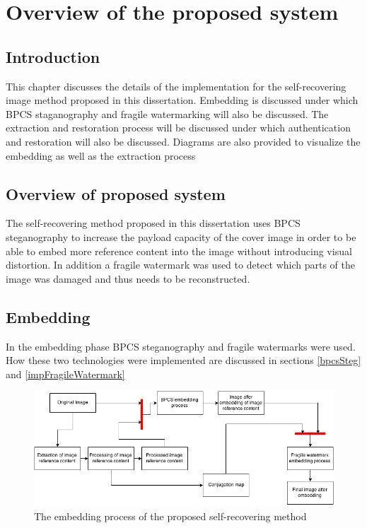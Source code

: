 \documentclass[12pt]{article}
\begin{document}
\section{Overview of the proposed system}
\label{Implementation}
\subsection{Introduction}
This chapter discusses the details of the implementation for the self-recovering image method proposed in this dissertation. Embedding is discussed under which BPCS staganography and fragile watermarking will also be discussed.
The extraction and restoration process will be discussed under which authentication and restoration will also be discussed.
Diagrams are also provided to visualize the embedding as well as the extraction process

\subsection{Overview of proposed system}
\label{impOverview}
The self-recovering method proposed in this dissertation uses BPCS steganography to increase the payload capacity of the cover image in order to be able to embed more reference content into the image without introducing visual distortion.
In addition a fragile watermark was used to detect which parts of the image was damaged and thus needs to be reconstructed.

\subsection{Embedding}
\label{embedding}
In the embedding phase BPCS steganography and fragile watermarks were used.  How these two technologies were implemented are discussed in sections \ref{bpcsSteg} and \ref{impFragileWatermark}

\begin{figure}[h]
\centerline{%
\includegraphics[scale=0.6]{"EmbeddingProcess"}%
} %
\caption{The embedding process of the proposed self-recovering method}
\label{fig:embeddingProcess}
\end{figure}
\end{document}
